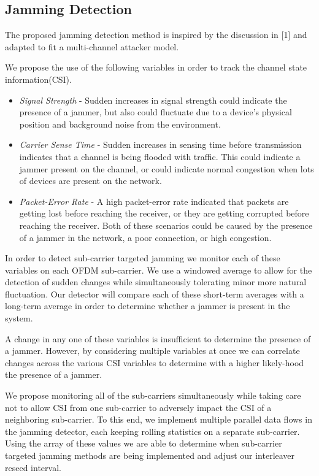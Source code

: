 \documentclass[sigconf]{acmart}
\begin{document}
\subsection{Jamming Detection}

The proposed jamming detection method is inspired by the discussion in [1] and adapted to fit a multi-channel attacker model.

We propose the use of the following variables in order to track the channel state information(CSI). 
\begin{itemize}
    \item \textit{Signal Strength} - Sudden increases in signal strength could indicate the presence of a jammer, but also could fluctuate due to a device's physical position and background noise from the environment.
    \item \textit{Carrier Sense Time} - Sudden increases in sensing time before transmission indicates that a channel is being flooded with traffic. This could indicate a jammer present on the channel, or could indicate normal congestion when lots of devices are present on the network.
    \item \textit{Packet-Error Rate} - A high packet-error rate indicated that packets are getting lost before reaching the receiver, or they are getting corrupted before reaching the receiver. Both of these scenarios could be caused by the presence of a jammer in the network, a poor connection, or high congestion.
\end{itemize}
In order to detect sub-carrier targeted jamming we monitor each of these variables on each OFDM sub-carrier. We use a windowed average to allow for the detection of sudden changes while simultaneously tolerating minor more natural fluctuation. Our detector will compare each of these short-term averages with a long-term average in order to determine whether a jammer is present in the system. 

A change in any one of these variables is insufficient to determine the presence of a jammer. However, by considering multiple variables at once we can correlate changes across the various CSI variables to determine with a higher likely-hood the presence of a jammer. 

We propose monitoring all of the sub-carriers simultaneously while taking care not to allow CSI from one sub-carrier to adversely impact the CSI of a neighboring sub-carrier. To this end, we implement multiple parallel data flows in the jamming detector, each keeping rolling statistics on a separate sub-carrier. Using the array of these values we are able to determine when sub-carrier targeted jamming methods are being implemented and adjust our interleaver reseed interval. 
\end{document}
